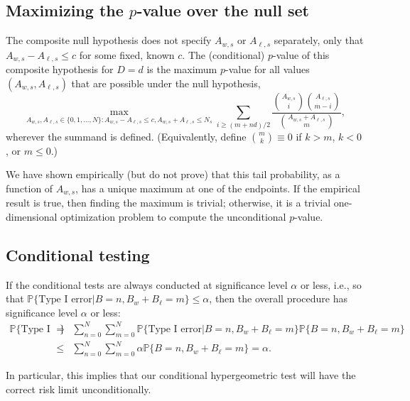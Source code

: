\subsection{Maximizing the $p$-value over the null set}

The composite null hypothesis does not specify $A_{w,s}$ or $A_{\ell,s}$ separately, only 
that $A_{w,s} - A_{\ell,s} \le c$ for
some fixed, known $c$.
The (conditional) $p$-value of this composite hypothesis for $D=d$ is the maximum $p$-value for all
values $(A_{w,s}, A_{\ell,s})$ that are possible under the null hypothesis,
\begin{equation}
  \max_{A_{w,s}, A_{\ell,s} \in \{0, 1, \ldots, N \}: A_{w,s} - A_{\ell,s} \le c, A_{w,s} + A_{\ell,s} \le N_s}
   \sum_{i \geq (m+nd)/2} \frac{ {A_{w,s} \choose i}{A_{\ell,s} \choose m-i} }{{A_{w,s} + A_{\ell, s} \choose m}},
\end{equation}
wherever the summand is defined. 
(Equivalently, define ${m \choose k} \equiv 0$ if $k > m$, $k < 0$, or $m \le 0$.)



We have shown empirically (but do not prove) that this tail probability, as a function of $A_{w,s}$,
has a unique maximum at one of the endpoints.
If the empirical result is true, then finding the maximum is trivial;
otherwise, it is a trivial one-dimensional optimization problem to compute the unconditional $p$-value.

\subsection{Conditional testing}
If the conditional tests are always conducted at significance level $\alpha$ or less, i.e., so that
$\mathbb{P} \{\mbox{Type I error} | B = n, B_w+B_\ell = m\} \le \alpha$, then the
overall procedure has significance level $\alpha$ or less:
\begin{eqnarray}
    \mathbb{P} \{\mbox{Type I error}\} &=& \sum_{n=0}^N\sum_{m=0}^{N} \mathbb{P} \{\mbox{Type I error} |  B = n, B_w+B_\ell = m\} \mathbb{P} \{ B = n, B_w+B_\ell = m \} \nonumber \\
       & \le & \sum_{n=0}^N\sum_{m=0}^{N}  \alpha \mathbb{P} \{  B = n, B_w+B_\ell = m \}  =  \alpha.
\end{eqnarray}

In particular, this implies that our conditional hypergeometric test will have the correct risk limit unconditionally.
